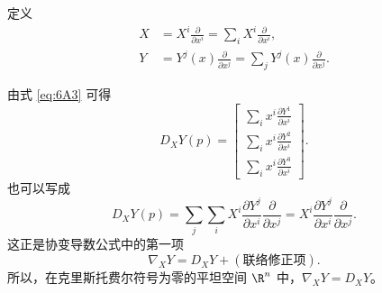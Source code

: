 定义
\begin{align*}
  X&=X^i\frac{\partial}{\partial x^i}
     =\sum_i X^i\frac{\partial}{\partial x^i},\\
  Y&=Y^j(x)\frac{\partial}{\partial x^j}
     =\sum_j Y^j(x)\frac{\partial}{\partial x^j}.
\end{align*}

由式 \eqref{eq:6A3} 可得
\[
  D_XY(p)=
  \begin{bmatrix}
    \displaystyle\sum_i x^i\frac{\partial Y^1}{\partial x^i}\\[5pt]
    \displaystyle\sum_i x^i\frac{\partial Y^2}{\partial x^i}\\[5pt]
    \displaystyle\sum_i x^i\frac{\partial Y^3}{\partial x^i}
  \end{bmatrix}.
\]
也可以写成
\begin{equation*}
  D_XY(p)=\sum_j\sum_i X^i\frac{\partial Y^j}{\partial x^i}\frac{\partial}{\partial x^j}
    =X^i\frac{\partial Y^j}{\partial x^i}\frac{\partial}{\partial x^j}.
  \tag{6A4}\label{eq:6A4}
\end{equation*}
这正是协变导数公式中的第一项
\[
  \nabla_XY=D_XY+(\text{联络修正项}).
\]
所以，在克里斯托费尔符号为零的平坦空间 $\R^n$ 中，$\nabla_XY=D_XY$。

